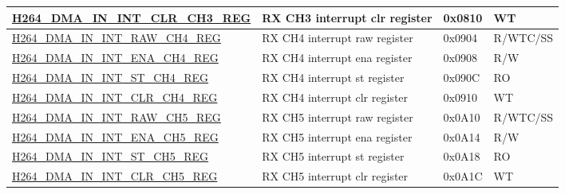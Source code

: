 \begin{longtable}{ | p{7.5cm} | p{5.7cm} | p{1.2cm} | p{1.5cm} | }
\hyperref[regdesc:H264DMAININTCLRCH3REG]{H264\_DMA\_IN\_INT\_CLR\_CH3\_REG} & RX CH3  interrupt clr register & 0x0810 & WT \\ \hline
\hyperref[regdesc:H264DMAININTRAWCH4REG]{H264\_DMA\_IN\_INT\_RAW\_CH4\_REG} & RX CH4  interrupt raw register & 0x0904 & R/WTC/SS \\ \hline
\hyperref[regdesc:H264DMAININTENACH4REG]{H264\_DMA\_IN\_INT\_ENA\_CH4\_REG} & RX CH4  interrupt ena register & 0x0908 & R/W \\ \hline
\hyperref[regdesc:H264DMAININTSTCH4REG]{H264\_DMA\_IN\_INT\_ST\_CH4\_REG} & RX CH4  interrupt st register & 0x090C & RO \\ \hline
\hyperref[regdesc:H264DMAININTCLRCH4REG]{H264\_DMA\_IN\_INT\_CLR\_CH4\_REG} & RX CH4  interrupt clr register & 0x0910 & WT \\ \hline
\hyperref[regdesc:H264DMAININTRAWCH5REG]{H264\_DMA\_IN\_INT\_RAW\_CH5\_REG} & RX CH5  interrupt raw register & 0x0A10 & R/WTC/SS \\ \hline
\hyperref[regdesc:H264DMAININTENACH5REG]{H264\_DMA\_IN\_INT\_ENA\_CH5\_REG} & RX CH5  interrupt ena register & 0x0A14 & R/W \\ \hline
\hyperref[regdesc:H264DMAININTSTCH5REG]{H264\_DMA\_IN\_INT\_ST\_CH5\_REG} & RX CH5  interrupt st register & 0x0A18 & RO \\ \hline
\hyperref[regdesc:H264DMAININTCLRCH5REG]{H264\_DMA\_IN\_INT\_CLR\_CH5\_REG} & RX CH5  interrupt clr register & 0x0A1C & WT \\ \hline


\end{longtable}
